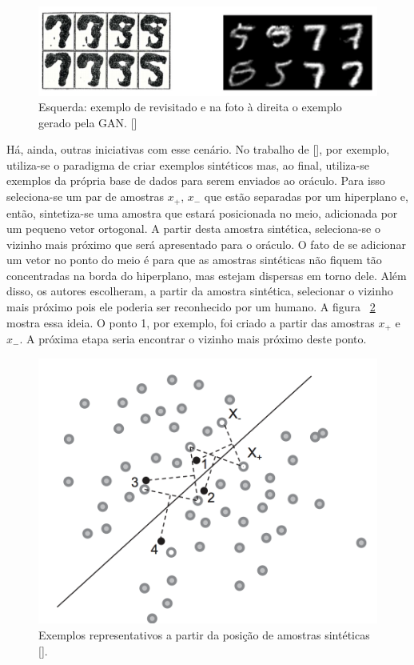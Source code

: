 \begin{figure}
  \centering
  \includegraphics[width=.9\textwidth]{figures/generative_GAN_AL_5_vs_9.png}
  \caption{Esquerda: exemplo de \cite{baum1992query} revisitado e na foto à direita o exemplo gerado pela GAN. [\cite{zhu2017generative}]}
  \label{fig:GAN_5_vs_9}
\end{figure}


Há, ainda, outras iniciativas com esse cenário. No trabalho de [\cite{wang2015active}], por exemplo, utiliza-se o paradigma de criar exemplos sintéticos mas, ao final, utiliza-se exemplos da própria base de dados para serem enviados ao oráculo. Para isso seleciona-se um par de amostras {$x_+$, $x_-$} que estão separadas por um hiperplano e, então, sintetiza-se uma amostra que estará posicionada no meio, adicionada por um pequeno vetor ortogonal. A partir desta amostra sintética, seleciona-se o vizinho mais próximo que será apresentado para o oráculo. O fato de se adicionar um vetor no ponto do meio é para que as amostras sintéticas não fiquem tão concentradas na borda do hiperplano, mas estejam dispersas em torno dele. Além disso, os autores escolheram, a partir da amostra sintética, selecionar o vizinho mais próximo pois ele poderia ser reconhecido por um humano. A figura ~\ref{fig:wang_2015_membership}  mostra essa ideia. O ponto 1, por exemplo, foi criado a partir das amostras $x_+$ e $x_-$. A próxima etapa seria encontrar o vizinho mais próximo deste ponto.

\begin{figure}
  \centering
  \includegraphics[width=.5\textwidth]{figures/wang_2015_membership.png}
  \caption{Exemplos representativos a partir da posição de amostras sintéticas [\cite{wang2015active}].}
  \label{fig:wang_2015_membership}
\end{figure}


